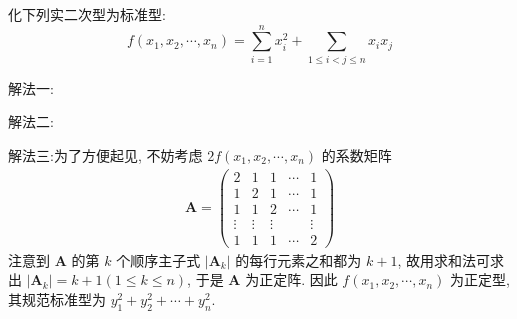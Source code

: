 \documentclass[../../main.tex]{subfiles}
\begin{document}
\begin{example}
化下列实二次型为标准型:
\[f(x_1,x_2,\cdots,x_n)=\sum_{i = 1}^{n}x_i^2+\sum_{1\leqslant  i < j\leqslant  n}x_ix_j\]
\end{example}
\begin{solution}
{\color{blue}解法一:}

{\color{blue}解法二:}

{\color{blue}解法三:}为了方便起见, 不妨考虑 \(2f(x_1,x_2,\cdots,x_n)\) 的系数矩阵
\begin{align*}
\boldsymbol{A} = \begin{pmatrix}
2 & 1 & 1 & \cdots & 1 \\
1 & 2 & 1 & \cdots & 1 \\
1 & 1 & 2 & \cdots & 1 \\
\vdots & \vdots & \vdots & & \vdots \\
1 & 1 & 1 & \cdots & 2
\end{pmatrix}
\end{align*}
注意到 \(\boldsymbol{A}\) 的第 \(k\) 个顺序主子式 \(|\boldsymbol{A}_k|\) 的每行元素之和都为 \(k + 1\), 故用求和法可求出 \(|\boldsymbol{A}_k| = k + 1(1\leqslant  k\leqslant  n)\), 于是 \(\boldsymbol{A}\) 为正定阵. 因此 \(f(x_1,x_2,\cdots,x_n)\) 为正定型, 其规范标准型为 \(y_1^2 + y_2^2 + \cdots + y_n^2\). 

\end{solution}
\end{document}
